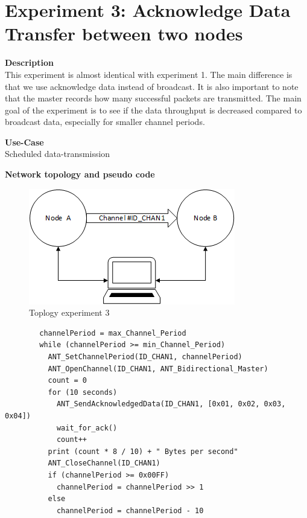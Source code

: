 \section{Experiment 3: Acknowledge Data Transfer between two nodes}
\begin{description} 
	\item{\textbf{Description}} \hfill \\ This experiment is almost identical with experiment 1. The main difference is that we use acknowledge data instead of broadcast. It is also important to note that the master records how many successful packets are transmitted. The main goal of the experiment is to see if the data throughput is decreased compared to broadcast data, especially for smaller channel periods.
	\item{\textbf{Use-Case}} \hfill \\ Scheduled data-transmission
	\item{\textbf{Network topology and pseudo code}} \hfill \\
	\begin{figure}[H]
		\centering
		\includegraphics[scale=1]{content/images/exp_topo.png}
		\caption{Toplogy experiment 3}
	\end{figure}
	\begin{code}[H]
		\begin{verbatim}
		channelPeriod = max_Channel_Period
		while (channelPeriod >= min_Channel_Period) 
		  ANT_SetChannelPeriod(ID_CHAN1, channelPeriod)
		  ANT_OpenChannel(ID_CHAN1, ANT_Bidirectional_Master)
		  count = 0
		  for (10 seconds) 
		    ANT_SendAcknowledgedData(ID_CHAN1, [0x01, 0x02, 0x03, 0x04])	   
		    wait_for_ack()
		    count++
		  print (count * 8 / 10) + " Bytes per second"	  
		  ANT_CloseChannel(ID_CHAN1)
		  if (channelPeriod >= 0x00FF)
		    channelPeriod = channelPeriod >> 1
		  else
		    channelPeriod = channelPeriod - 10
		\end{verbatim}
		\caption{Acknowledge data transfer (Master)}\label{lst:mExp3}
	\end{code}
	

\end{description}
